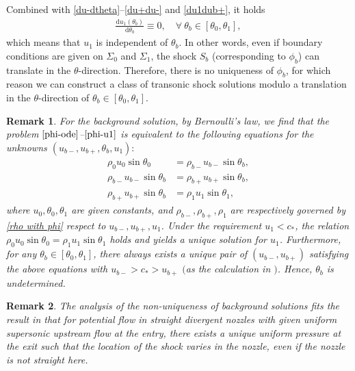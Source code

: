 \documentclass[reqno,12pt]{amsart}
\newcommand{\dd}{\mathrm{d}}
\newtheorem{remark}{Remark}[section]
\numberwithin{equation}{section}
\begin{document}
Combined with \eqref{du-dtheta}--\eqref{du+du-} and \eqref{du1dub+}, it holds
	\begin{align}
		\frac{\dd u_1(\theta_b)}{\dd \theta_b }\equiv 0, \quad\forall ~\theta_b\in [\theta_0, \theta_1],
	\end{align}
which means that $u_1$ is independent of  $\theta_b$. In other words, even if boundary conditions are given on $\Sigma_0$ and $\Sigma_1$, the shock  $S_b$ (corresponding to $\phi_b$) can translate in the  $\theta$-direction. Therefore, there is no uniqueness of $\phi_b$, for which reason we can construct a class of transonic shock solutions modulo a translation in the $ \theta$-direction of $\theta_b\in[\theta_0,\theta_1]$. 
\begin{remark}\label{keypoint}
   For the background solution, by Bernoulli's law, we find that the problem $\eqref{phi-ode}$--$\eqref{phi-u1}$ is equivalent to the following equations for the unknowns $(u_{b-},u_{b+},\theta_b, u_1):$
		\begin{align*}
		\rho_0u_0\sin\theta_0&=\rho_{b-}u_{b-}\sin\theta_b,\\
        \rho_{b-}u_{b-}\sin\theta_b&=\rho_{b+}u_{b+}\sin\theta_b,\\
			\rho_{b+}u_{b+}\sin\theta_b&=\rho_1u_1\sin\theta_1,   
		\end{align*}			
    where $u_0, \theta_0, \theta_1$ are given constants, and $\rho_{b-}, \rho_{b+}, \rho_1$ are respectively governed by \eqref{rho with phi} respect to $u_{b-}, u_{b+}, u_1$. Under the requirement $u_1<c_*$, the relation $\rho_0u_0\sin\theta_0=\rho_1u_1\sin\theta_1$ holds and yields a unique solution for $u_1$. Furthermore, for any $\theta_b\in[\theta_0,\theta_1]$, there always exists a unique pair of  $(u_{b-},u_{b+})$ satisfying the above equations with $u_{b-}>c_*>u_{b+}$ $($as the calculation in \cite[Lemma 2.1]{tssCF}$)$. Hence, $\theta_b$ is undetermined.
	\end{remark}
\begin{remark}
    The analysis of the non-uniqueness of background solutions fits the result in \cite{tssCF} that for potential flow in straight divergent nozzles with given uniform supersonic upstream flow at the entry, there exists a unique uniform pressure at the exit such that the location of the shock varies in the nozzle, even if the nozzle is not straight here.
\end{remark}
    
\end{document}
